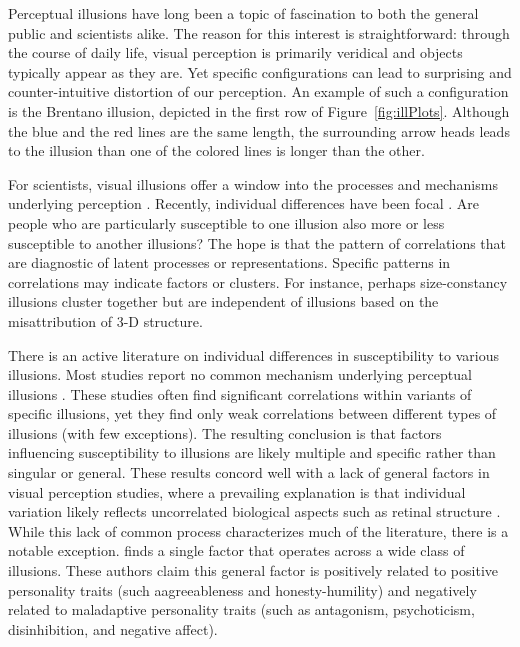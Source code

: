 

Perceptual illusions have long been a topic of fascination to both the general public and scientists alike. The reason for this interest is straightforward: through the course of daily life, visual perception is primarily veridical and objects typically appear as they are.  Yet specific configurations can lead to surprising and counter-intuitive distortion of our perception. An example of such a configuration is the Brentano illusion, depicted in the first row of Figure~\ref{fig:illPlots}. Although the blue and the red lines are the same length, the surrounding arrow heads leads to the illusion than one of the colored lines is longer than the other.

For scientists, visual illusions offer a window into the processes and mechanisms underlying perception \parencite[]{Coren.Girgus.2020}. Recently, individual differences have been focal \parencite[see][]{Tulver.2019}.  Are people who are particularly susceptible to one illusion also more or less susceptible to another illusions?  The hope is that the pattern of correlations that are diagnostic of latent processes or representations.  Specific patterns in correlations may indicate factors or clusters.  For instance, perhaps size-constancy illusions cluster together but are independent of illusions based on the misattribution of 3-D structure.  


There is an active literature on individual differences in susceptibility to various illusions.  Most studies report no common mechanism underlying perceptual illusions \parencite[]{Mazuz.etal.2023, Grzeczkowski.etal.2017, Cretenoud.etal.2019, Bosten.etal.2017, Cottier.etal.2023, Ward.etal.2017}. These studies often find significant correlations within variants of specific illusions, yet they find only weak correlations between different types of illusions (with few exceptions).  The resulting conclusion is that factors influencing susceptibility to illusions are likely multiple and specific rather than singular or general.  These results concord well with a lack of general factors in visual perception studies, where a prevailing explanation is that individual variation likely reflects uncorrelated biological aspects such as retinal structure \parencite[e.g.,][]{Mollon.etal.2017, Bosten.Mollon.2010}.  While this lack of common process characterizes much of the literature, there is a notable  exception.  \textcite{Makowski.etal.2023} finds a single factor that operates across a wide class of illusions.  These authors claim this general factor is positively related to positive personality traits (such aagreeableness and honesty-humility) and negatively related to maladaptive personality traits (such as antagonism, psychoticism, disinhibition, and negative affect). 

